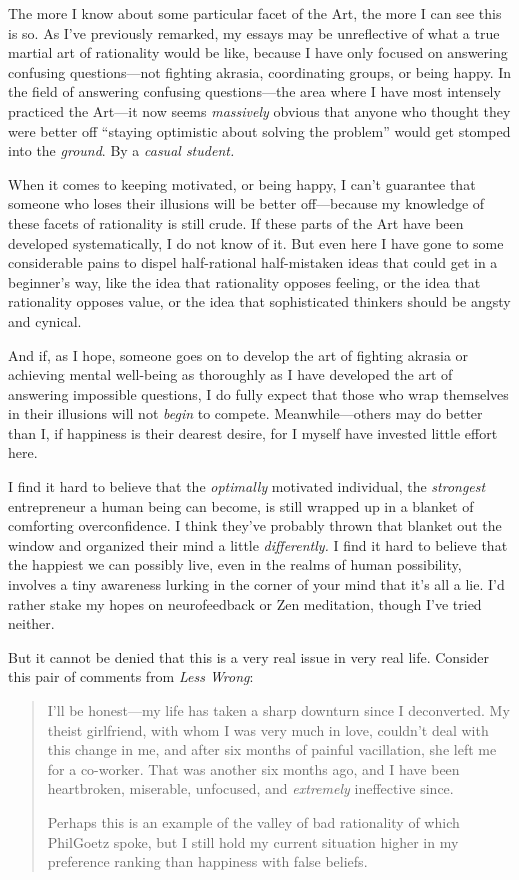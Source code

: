 {
 The more I know about some particular facet of the Art, the more I
can see this is so. As I've previously remarked, my
essays may be unreflective of what a true martial art of rationality
would be like, because I have only focused on answering confusing
questions---not fighting akrasia, coordinating groups, or being happy.
In the field of answering confusing questions---the area where I have
most intensely practiced the Art---it now seems \textit{massively}
obvious that anyone who thought they were better off
``staying optimistic about solving the
problem'' would get stomped into the \textit{ground}.
By a \textit{casual student.}}

{
 When it comes to keeping motivated, or being happy, I
can't guarantee that someone who loses their illusions
will be better off---because my knowledge of these facets of
rationality is still crude. If these parts of the Art have been
developed systematically, I do not know of it. But even here I have
gone to some considerable pains to dispel half-rational half-mistaken
ideas that could get in a beginner's way, like the idea
that rationality opposes feeling, or the idea that rationality opposes
value, or the idea that sophisticated thinkers should be angsty and
cynical.}

{
 And if, as I hope, someone goes on to develop the art of fighting
akrasia or achieving mental well-being as thoroughly as I have
developed the art of answering impossible questions, I do fully expect
that those who wrap themselves in their illusions will not
\textit{begin} to compete. Meanwhile---others may do better than I, if
happiness is their dearest desire, for I myself have invested little
effort here.}

{
 I find it hard to believe that the \textit{optimally} motivated
individual, the \textit{strongest} entrepreneur a human being can
become, is still wrapped up in a blanket of comforting overconfidence.
I think they've probably thrown that blanket out the
window and organized their mind a little \textit{differently.} I find
it hard to believe that the happiest we can possibly live, even in the
realms of human possibility, involves a tiny awareness lurking in the
corner of your mind that it's all a lie.
I'd rather stake my hopes on neurofeedback or Zen
meditation, though I've tried neither.}

{
 But it cannot be denied that this is a very real issue in very
real life. Consider this pair of comments from \textit{Less Wrong}:}

\begin{quotation}
{
 I'll be honest---my life has taken a sharp
downturn since I deconverted. My theist girlfriend, with whom I was
very much in love, couldn't deal with this change in
me, and after six months of painful vacillation, she left me for a
co-worker. That was another six months ago, and I have been
heartbroken, miserable, unfocused, and \textit{extremely} ineffective
since.}

{
 Perhaps this is an example of the valley of bad rationality of
which PhilGoetz spoke, but I still hold my current situation higher in
my preference ranking than happiness with false beliefs.}
\end{quotation}

